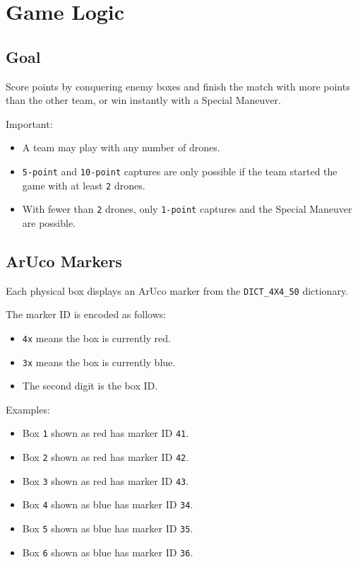\section{Game Logic}

\subsection{Goal}

Score points by conquering enemy boxes and finish the match with more points than the other team, or win instantly with a Special Maneuver.

Important:
\begin{itemize}
    \item A team may play with any number of drones.
    \item \texttt{5-point} and \texttt{10-point} captures are only possible if the team started the game with at least \texttt{2} drones.
    \item With fewer than \texttt{2} drones, only \texttt{1-point} captures and the Special Maneuver are possible.
\end{itemize}

\subsection{ArUco Markers}

Each physical box displays an ArUco marker from the \texttt{DICT\_4X4\_50} dictionary.

The marker ID is encoded as follows:
\begin{itemize}
    \item \texttt{4x} means the box is currently red.
    \item \texttt{3x} means the box is currently blue.
    \item The second digit is the box ID.
\end{itemize}

Examples:
\begin{itemize}
    \item Box \texttt{1} shown as red has marker ID \texttt{41}.
    \item Box \texttt{2} shown as red has marker ID \texttt{42}.
    \item Box \texttt{3} shown as red has marker ID \texttt{43}.
    \item Box \texttt{4} shown as blue has marker ID \texttt{34}.
    \item Box \texttt{5} shown as blue has marker ID \texttt{35}.
    \item Box \texttt{6} shown as blue has marker ID \texttt{36}.
\end{itemize}

